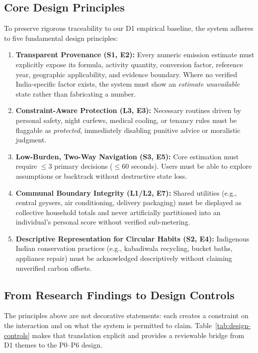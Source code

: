 \documentclass[12pt,a4paper]{article}
\begin{document}
\subsection{Core Design Principles}
To preserve rigorous traceability to our D1 empirical baseline, the system adheres to five fundamental design principles:
\begin{enumerate}[label=\textbf{\color{Teal}DP\arabic*.},leftmargin=*,itemsep=0.68em,topsep=0.5em]
  \item \textbf{Transparent Provenance (S1, E2):} Every numeric emission estimate must explicitly expose its formula, activity quantity, conversion factor, reference year, geographic applicability, and evidence boundary. Where no verified India-specific factor exists, the system must show an \emph{estimate unavailable} state rather than fabricating a number.
  \item \textbf{Constraint-Aware Protection (L3, E3):} Necessary routines driven by personal safety, night curfews, medical cooling, or tenancy rules must be flaggable as \emph{protected}, immediately disabling punitive advice or moralistic judgment.
  \item \textbf{Low-Burden, Two-Way Navigation (S3, E5):} Core estimation must require $\le 3$ primary decisions ($\le 60$ seconds). Users must be able to explore assumptions or backtrack without destructive state loss.
  \item \textbf{Communal Boundary Integrity (L1/L2, E7):} Shared utilities (e.g., central geysers, air conditioning, delivery packaging) must be displayed as collective household totals and never artificially partitioned into an individual's personal score without verified sub-metering.
  \item \textbf{Descriptive Representation for Circular Habits (S2, E4):} Indigenous Indian conservation practices (e.g., kabadiwala recycling, bucket baths, appliance repair) must be acknowledged descriptively without claiming unverified carbon offsets.
\end{enumerate}

\subsection{From Research Findings to Design Controls}
The principles above are not decorative statements: each creates a constraint on the interaction and on what the system is permitted to claim. Table~\ref{tab:design-controls} makes that translation explicit and provides a reviewable bridge from D1 themes to the P0--P6 design.
\end{document}
